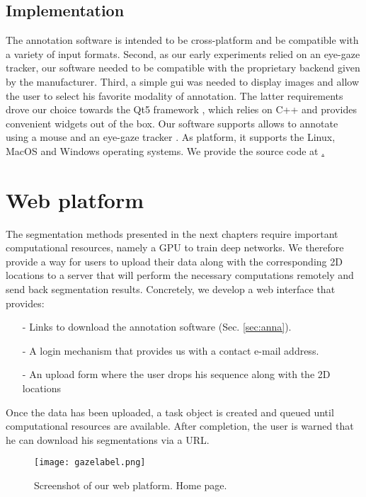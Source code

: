 \subsection{Implementation}
The annotation software is intended to be cross-platform and be compatible with a variety of input formats.
Second, as our early experiments relied on an eye-gaze tracker, our software needed to be compatible with the proprietary backend given by the manufacturer.
Third, a simple \gls{gui} was needed to display images and allow the user to select his favorite modality of annotation.
The latter requirements drove our choice towards the Qt5 framework \cite{eng16}, which relies on C++ and provides convenient widgets out of the box.
Our software supports allows to annotate using a mouse and an eye-gaze tracker \cite{eyetribe}.
As platform, it supports the Linux, MacOS and Windows operating systems.
We provide the source code at \href{https://github.com/aimi-lab/Anna}.

\section{Web platform}
The segmentation methods presented in the next chapters require important computational resources, namely a GPU to train deep networks.
We therefore provide a way for users to upload their data along with the corresponding 2D locations to a server that will perform the necessary computations remotely and send back segmentation results.
Concretely, we develop a web interface that provides:

\begin{itemize}
  \item[-]{Links to download the annotation software (Sec. \ref{sec:anna}).}
  \item[-]{A login mechanism that provides us with a contact e-mail address.}
  \item[-]{An upload form where the user drops his sequence along with the 2D locations}
\end{itemize}

Once the data has been uploaded, a task object is created and queued until computational resources are available.
After completion, the user is warned that he can download his segmentations via a URL.

\begin{figure}[!htpb]
  \texttt{[image: gazelabel.png]}
  \caption{Screenshot of our web platform. Home page.}
  \label{fig:anna}
\end{figure}

